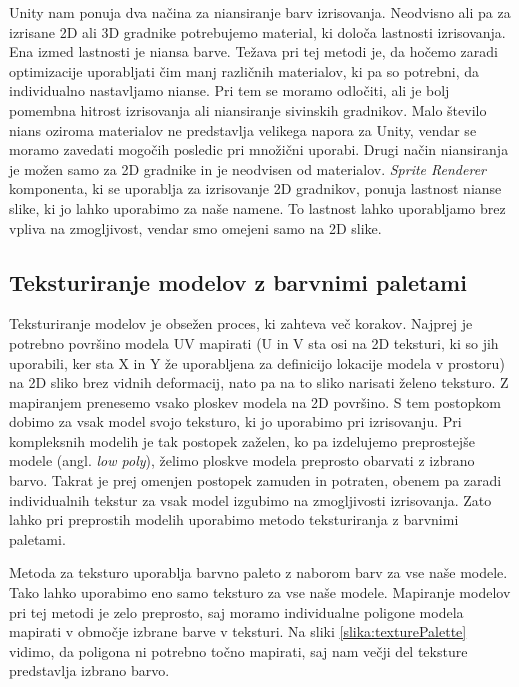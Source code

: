 \documentclass[12pt,a4paper,twoside]{book}
\begin{document}
Unity nam ponuja dva načina za niansiranje barv izrisovanja. Neodvisno ali pa za izrisane 2D ali 3D gradnike potrebujemo material, ki določa lastnosti izrisovanja. Ena izmed lastnosti je niansa barve. Težava pri tej metodi je, da hočemo zaradi optimizacije uporabljati čim manj različnih materialov, ki pa so potrebni, da individualno nastavljamo nianse. Pri tem se moramo odločiti, ali je bolj pomembna hitrost izrisovanja ali niansiranje sivinskih gradnikov. Malo število nians oziroma materialov ne predstavlja velikega napora za Unity, vendar se moramo zavedati mogočih posledic pri množični uporabi. Drugi način niansiranja je možen samo za 2D gradnike in je neodvisen od materialov. \textit{Sprite Renderer} komponenta, ki se uporablja za izrisovanje 2D gradnikov, ponuja lastnost nianse slike, ki jo lahko uporabimo za naše namene. To lastnost lahko uporabljamo brez vpliva na zmogljivost, vendar smo omejeni samo na 2D slike.

\subsection{Teksturiranje modelov z barvnimi paletami}
Teksturiranje modelov je obsežen proces, ki zahteva več korakov. Najprej je potrebno površino modela UV mapirati (U in V sta osi na 2D teksturi, ki so jih uporabili, ker sta X in Y že uporabljena za definicijo lokacije modela v prostoru) na 2D sliko brez vidnih deformacij, nato pa na to sliko narisati želeno teksturo. Z mapiranjem prenesemo vsako ploskev modela na 2D površino. S tem postopkom dobimo za vsak model svojo teksturo, ki jo uporabimo pri izrisovanju. Pri kompleksnih modelih je tak postopek zaželen, ko pa izdelujemo preprostejše modele (angl. \textit{low poly}), želimo ploskve modela preprosto obarvati z izbrano barvo. Takrat je prej omenjen postopek zamuden in potraten, obenem pa zaradi individualnih tekstur za vsak model izgubimo na zmogljivosti izrisovanja. Zato lahko pri preprostih modelih uporabimo metodo teksturiranja z barvnimi paletami.

Metoda za teksturo uporablja barvno paleto z naborom barv za vse naše modele. Tako lahko uporabimo eno samo teksturo za vse naše modele. Mapiranje modelov pri tej metodi je zelo preprosto, saj moramo individualne poligone modela mapirati v območje izbrane barve v teksturi. Na sliki \ref{slika:texturePalette} vidimo, da poligona ni potrebno točno mapirati, saj nam večji del teksture predstavlja izbrano barvo. 
\end{document}
